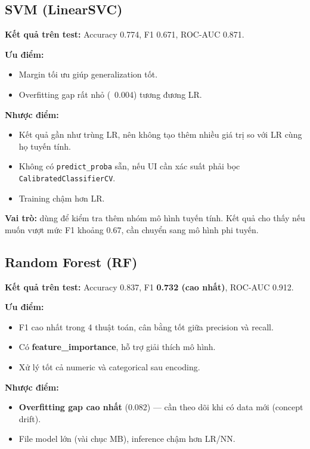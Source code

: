 \documentclass[12pt, a4paper]{article}
\begin{document}
\subsection{SVM (LinearSVC)}

\textbf{Kết quả trên test:} Accuracy 0.774, F1 0.671, ROC-AUC 0.871.

\textbf{Ưu điểm:}
\begin{itemize}
    \item Margin tối ưu giúp generalization tốt.
    \item Overfitting gap rất nhỏ (~0.004) tương đương LR.
\end{itemize}

\textbf{Nhược điểm:}
\begin{itemize}
    \item Kết quả gần như trùng LR, nên không tạo thêm nhiều giá trị so với LR cùng họ tuyến tính.
    \item Không có \texttt{predict\_proba} sẵn, nếu UI cần xác suất phải bọc \texttt{CalibratedClassifierCV}.
    \item Training chậm hơn LR.
\end{itemize}

\textbf{Vai trò:} dùng để kiểm tra thêm nhóm mô hình tuyến tính. Kết quả cho thấy nếu muốn vượt mức F1 khoảng 0.67, cần chuyển sang mô hình phi tuyến.

\subsection{Random Forest (RF)}

\textbf{Kết quả trên test:} Accuracy 0.837, F1 \textbf{0.732 (cao nhất)}, ROC-AUC 0.912.

\textbf{Ưu điểm:}
\begin{itemize}
    \item F1 cao nhất trong 4 thuật toán, cân bằng tốt giữa precision và recall.
    \item Có \textbf{feature\_importance}, hỗ trợ giải thích mô hình.
    \item Xử lý tốt cả numeric và categorical sau encoding.
\end{itemize}

\textbf{Nhược điểm:}
\begin{itemize}
    \item \textbf{Overfitting gap cao nhất} (0.082) --- cần theo dõi khi có data mới (concept drift).
    \item File model lớn (vài chục MB), inference chậm hơn LR/NN.
\end{itemize}
\end{document}
